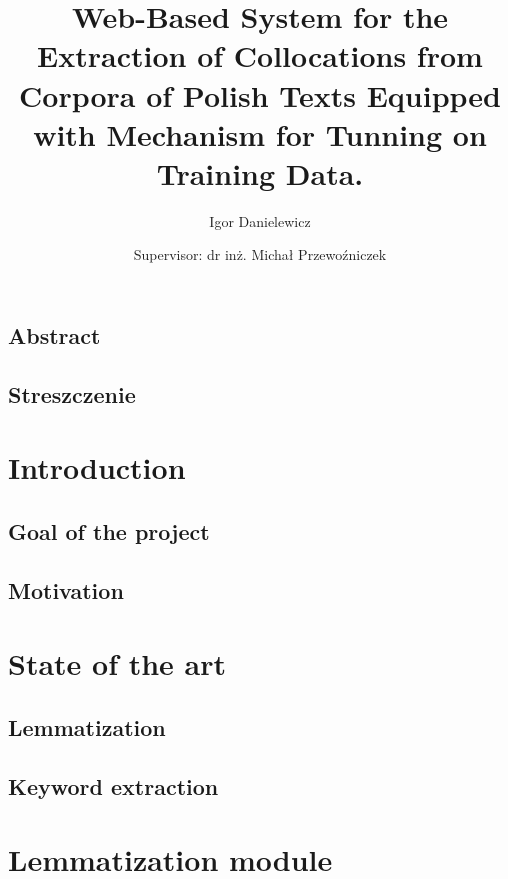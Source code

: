 \documentclass[12pt]{report}
\title{Web-Based System for the Extraction of Collocations from Corpora of Polish Texts Equipped with Mechanism for Tunning on Training Data.}
\author{Igor Danielewicz\\ \and Supervisor: dr inż. Michał Przewoźniczek}
\begin{document}
\begin{titlepage}
	
\end{titlepage}


\section*{Abstract}
\section*{Streszczenie}

\tableofcontents

\chapter{Introduction}
\section{Goal of the project}
\section{Motivation}

\chapter{State of the art}
\section{Lemmatization}
\section{Keyword extraction}
\chapter{Lemmatization module}
\end{document}
